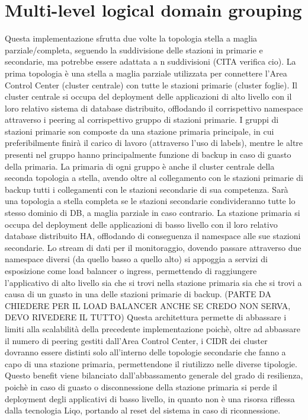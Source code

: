 \section{Multi-level logical domain grouping}
Questa implementazione sfrutta due volte la topologia stella a maglia parziale/completa, seguendo la suddivisione delle stazioni in primarie e secondarie, ma potrebbe essere adattata a n suddivisioni (CITA  verifica cio).
La prima topologia è una stella a maglia parziale utilizzata per connettere l'Area Control Center (cluster centrale) con tutte le stazioni primarie (cluster foglie). Il cluster centrale si occupa del deployment delle applicazioni di alto livello con il loro relativo sistema di database distribuito, offlodando il corrispettivo namespace attraverso i peering al corrispettivo gruppo di stazioni primarie. I gruppi di stazioni primarie son composte da una stazione primaria principale, in cui preferibilmente finirà il carico di lavoro (attraverso l'uso di labels), mentre le altre presenti nel gruppo hanno principalmente funzione di backup in caso di guasto della primaria.
La primaria di ogni gruppo è anche il cluster centrale della seconda topologia a stella, avendo oltre al collegamento con le stazioni primarie di backup tutti i collegamenti con le stazioni secondarie di sua competenza. Sarà una topologia a stella completa se le stazioni secondarie condivideranno tutte lo stesso dominio di DB, a maglia parziale in caso contrario. 
La stazione primaria si occupa del deployment delle applicazioni di basso livello con il loro relativo database distribuito HA, offlodando di conseguenza il namespace alle sue stazioni secondarie. Lo stream di dati per il monitoraggio, dovendo passare attraverso due namespace diversi (da quello basso a quello alto) si appoggia a servizi di esposizione come load balancer o ingress, permettendo di raggiungere l'applicativo di alto livello sia che si trovi nella stazione primaria sia che si trovi a causa di un guasto in una delle stazioni primarie di backup.
(PARTE DA CHIEDERE PER IL LOAD BALANCER ANCHE SE CREDO NON SERVA, DEVO RIVEDERE IL TUTTO)
Questa architettura permette di abbassare i limiti alla scalabilità della precedente implementazione poichè, oltre ad abbassare il numero di peering gestiti dall'Area Control Center, i CIDR dei cluster dovranno essere distinti solo all'interno delle topologie secondarie che fanno a capo di una stazione primaria, permettendone il riutilizzo nelle diverse tipologie. Questo benefit viene bilanciato dall'abbassamento generale del grado di resilienza, poichè in caso di guasto o disconnessione della stazione primaria si perde il deployment degli applicativi di basso livello, in quanto non è una risorsa riflessa dalla tecnologia Liqo, portando al reset del sistema in caso di riconnessione.

